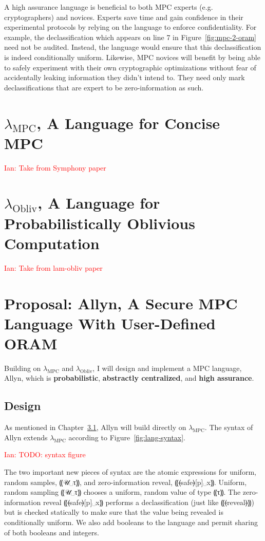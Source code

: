 \documentclass{report}
\newcommand{\lang}{Allyn\xspace}
\newcommand{\mpc}{\ensuremath{\lambda_{\mathrm{MPC}}}\xspace}
\newcommand{\obliv}{\ensuremath{\lambda_{\mathrm{Obliv}}}\xspace}
\newcommand{\ins}[1]{\textcolor{red}{Ian: #1}}
\begin{document}
A high assurance language is beneficial to both MPC experts (e.g. cryptographers) and novices. Experts save time and gain confidence in their
experimental protocols by relying on the language to enforce confidentiality. For example, the declassification which appears on line 7 in
Figure~\ref{fig:mpc-2-oram} need not be audited. Instead, the language would ensure that this declassification is indeed conditionally uniform.
Likewise, MPC novices will benefit by being able to safely experiment with their own cryptographic optimizations without fear of accidentally
leaking information they didn't intend to. They need only mark declassifications that are expert to be zero-information as such.

\chapter{\mpc, A Language for Concise MPC}

\ins{Take from Symphony paper}

\chapter{\obliv, A Language for Probabilistically Oblivious Computation}

\ins{Take from lam-obliv paper}

\chapter{Proposal: \lang, A Secure MPC Language With User-Defined ORAM}

Building on \mpc and \obliv, I will design and implement a MPC language, \lang, which is \textbf{probabilistic},
\textbf{abstractly centralized}, and \textbf{high assurance}.

\section{Design}

As mentioned in Chapter~\ref{}, \lang will build directly on \mpc. The syntax of \lang extends \mpc according to Figure~\ref{fig:lang-syntax}.

\ins{TODO: syntax figure}

The two important new pieces of syntax are the atomic expressions for uniform, random samples, ⸨𝒰␣τ⸩,
and zero-information reveal, ⸨⦑safe⦒[p]␣x⸩.
Uniform, random sampling ⸨𝒰␣τ⸩ chooses a uniform, random value of type ⸨τ⸩. The zero-information reveal ⸨⦑safe⦒[p]␣x⸩ performs a
declassification (just like ⸨⦑reveal⦒⸩) but is checked statically to make sure that the value being revealed is conditionally
uniform. We also add booleans to the language and permit sharing of both booleans and integers.
\end{document}
